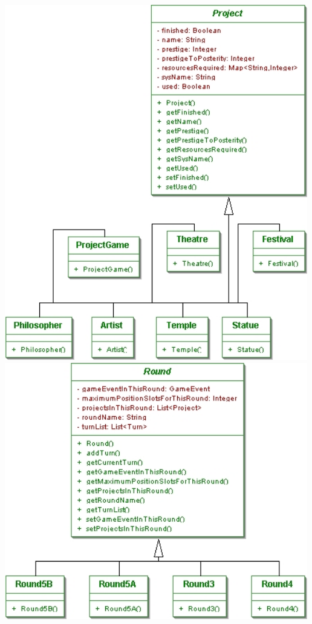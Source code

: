 \documentclass[11 pt]{book}
\begin{document}
\begin{center}
		    \includegraphics[width=500px]{design-uml/iteration7/projects.jpg}
		    \includegraphics[width=500px]{design-uml/iteration7/rounds.jpg}

\end{center}
\end{document}
